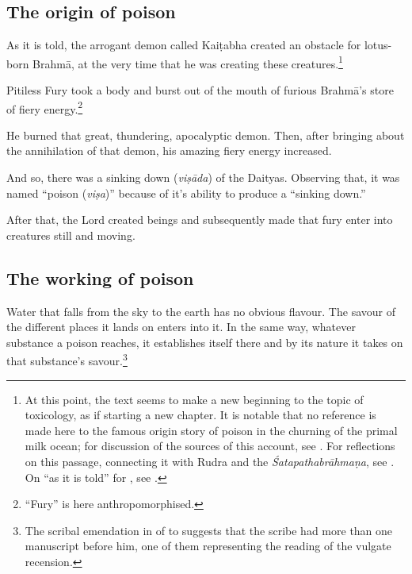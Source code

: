 \subsection{The origin of  poison}  

\begin{translation}[resume]  

\item
 [18]  As it is told, the arrogant  demon called Kaiṭabha  created an obstacle for 
 lotus-born Brahmā, at  the very time that he  was creating these  
 creatures.\footnote{At  this point, the text  seems to make a new  beginning to 
 the topic  of toxicology, as if  starting a new  chapter.  It is notable  that no 
 reference is  made here to  the famous origin  story of poison in the  churning 
 of the primal  milk ocean; for  discussion of the  sources of this  account, see  
 \cite{bede-1967}. For reflections on this  passage, connecting it  with Rudra 
 and the  \emph{Śatapathabrāhmaṇa},  see  \cite{mana-2019}.  On  “as it is 
 told” for , see \cite{emen-1969}.\label{kila}}  

\item
[19] Pitiless Fury took a  body and burst out of  the mouth of furious  Brahmā's 
store of fiery  energy.\footnote{“Fury”  is here  anthropomorphised.}  

\item
[20]  He burned that  great, thundering,  apocalyptic  demon. Then,  after 
bringing about the annihilation of  that demon, his  amazing fiery  energy 
increased.  

\item
 [21]  And so, there was a  sinking down  (\emph{viṣāda}) of  the Daityas.  
 Observing that, it was named  “poison  (\emph{viṣa})”  because of it's  ability 
 to produce a  “sinking down.”  

\item
 [22] After  that, the Lord  created beings and  subsequently made  that fury 
 enter into creatures  still and moving.  

\subsection{The working of poison}

\item
 [23--24]  Water that falls  from the sky to the  earth has no  obvious flavour. 
 The savour of the  different places it  lands on enters into  it.  In the same way, 
 whatever substance  a poison reaches, it  establishes itself  there and by its  
 nature it  takes on that  substance's  savour.\footnote{The  scribal emendation  
 in   of    to    
 suggests that the  scribe had more  than  one manuscript  before him, one  of 
 them  representing the  reading of the  vulgate  recension.}  


\end{translation}
